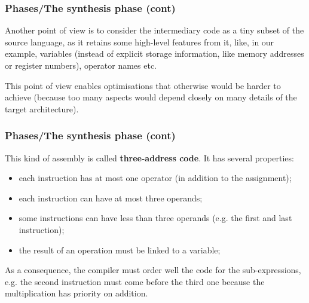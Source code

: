 %
\begin{frame}
\frametitle{Phases/The synthesis phase (cont)}

Another point of view is to consider the intermediary code as a tiny
subset of the source language, as it retains some high-level features
from it, like, in our example, variables (instead of explicit storage
information, like memory addresses or register numbers), operator
names etc.

\bigskip

This point of view enables optimisations that otherwise would be
harder to achieve (because too many aspects would depend closely on
many details of the target architecture).

\end{frame}

%
\begin{frame}
\frametitle{Phases/The synthesis phase (cont)}

This kind of assembly is called \textbf{three-address code}. It has
several properties:
\begin{itemize}

  \item each instruction has at most one operator (in addition to the
  assignment);

  \item each instruction can have at most three operands;

  \item some instructions can have less than three operands (e.g. the
  first and last instruction);

  \item the result of an operation must be linked to a variable;

\end{itemize}
As a consequence, the compiler must order well the code for the
sub-expressions, e.g. the second instruction must come before the
third one because the multiplication has priority on addition.

\end{frame}

